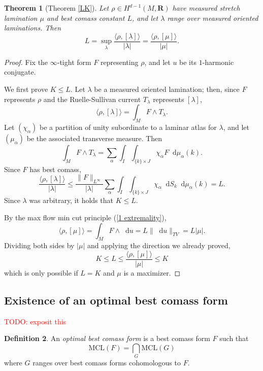 \documentclass[reqno,11pt]{amsart}
\newcommand{\RR}{\mathbf{R}}
\newcommand*\dif{\mathop{}\!\mathrm{d}}
\newcommand{\MCL}{\mathrm{MCL}}
\newcommand{\dfn}[1]{\emph{#1}\index{#1}}
\newtheorem{theorem}{Theorem}[section]
\theoremstyle{definition}
\newtheorem{definition}[theorem]{Definition}
\numberwithin{equation}{section}
\newcommand\todo[1]{\textcolor{red}{TODO: #1}}
\begin{document}
\begin{theorem}[Theorem \ref{LK}]\label{L equals K}
	Let $\rho \in H^{d - 1}(M, \RR)$ have measured stretch lamination $\mu$ and best comass constant $L$, and let $\lambda$ range over measured oriented laminations. Then 
	$$L = \sup_\lambda \frac{\langle \rho, [\lambda]\rangle}{|\lambda|} = \frac{\langle \rho, [\mu]\rangle}{|\mu|}.$$
\end{theorem}
\begin{proof}
Fix the $\infty$-tight form $F$ representing $\rho$, and let $u$ be its $1$-harmonic conjugate.

We first prove $K \leq L$.
Let $\lambda$ be a measured oriented lamination; then, since $F$ represents $\rho$ and the Ruelle-Sullivan current $T_\lambda$ represents $[\lambda]$,
$$\langle \rho, [\lambda]\rangle = \int_M F \wedge T_\lambda.$$
Let $(\chi_\alpha)$ be a partition of unity subordinate to a laminar atlas for $\lambda$, and let $(\mu_\alpha)$ be the associated transverse measure. Then 
$$\int_M F \wedge T_\lambda = \sum_\alpha \int_I \int_{\{k\} \times J} \chi_\alpha F \dif \mu_\alpha(k).$$
Since $F$ has best comass,
$$\frac{\langle \rho, [\lambda] \rangle}{|\lambda|}
\leq \frac{\|F\|_{L^\infty}}{|\lambda|} \sum_\alpha \int_I \int_{\{k\} \times J} \chi_\alpha \dif S_k \dif \mu_\alpha(k) = L.$$
Since $\lambda$ was arbitrary, it holds that $K \leq L$.

By the max flow min cut principle (\ref{1 extremality}),
$$\langle \rho, [\mu]\rangle = \int_M F \wedge \dif u = L \|\dif u\|_{TV} = L|\mu|.$$
Dividing both sides by $|\mu|$ and applying the direction we already proved,
$$K \leq L \leq \frac{\langle \rho, [\mu]\rangle}{|\mu|} \leq K$$
which is only possible if $L = K$ and $\mu$ is a maximizer.
\end{proof}

\subsection{Existence of an optimal best comass form}
\todo{exposit this}

\begin{definition}
An \dfn{optimal best comass form} is a best comass form $F$ such that
$$\MCL(F) = \bigcap_G \MCL(G)$$
where $G$ ranges over best comass forms cohomologous to $F$.
\end{definition}
\end{document}
